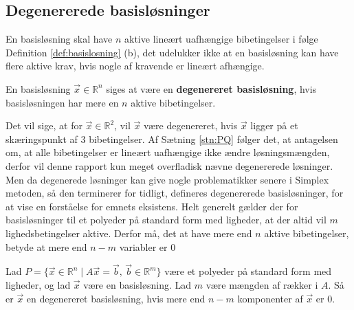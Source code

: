 \subsection{Degenererede basisløsninger}
En basisløsning skal have $n$ aktive lineært uafhængige bibetingelser i følge Definition \ref{def:basislosning} (b), det udelukker ikke at en basisløsning kan have flere aktive krav, hvis nogle af kravende er lineært afhængige. 
\begin{defn}
En basisløsning $\vec{x}\in \mathds{R}^n$ siges at være en \textbf{degenereret basisløsning}, hvis basisløsningen har mere en $n$ aktive bibetingelser.
\end{defn}
Det vil sige, at for $\vec{x}\in \mathds{R}^2$, vil $\vec{x}$ være degenereret, hvis $\vec{x}$ ligger på et skæringspunkt af $3$ bibetingelser.
Af Sætning \ref{stn:PQ} følger det, at antagelsen om, at alle bibetingelser er lineært uafhængige ikke ændre løsningsmængden, derfor vil denne rapport kun meget overfladisk nævne degenererede løsninger. 
Men da degenerede løsninger kan give nogle problematikker senere i Simplex metoden, så den terminerer for tidligt, defineres degenererede basisløsninger, for at vise en forståelse for emnets eksistens.
Helt generelt gælder der for basisløsninger til et polyeder på standard form med ligheder, at der altid vil $m$ lighedsbetingelser  aktive. Derfor må, det at have mere end $n$ aktive bibetingelser, betyde at mere end $n-m$ variabler er $0$
\begin{defn}
Lad $P =\{ \vec{x} \in \mathds{R}^n \mid A \vec{x} = \vec{b}, \, \vec{b}\in \mathds{R}^m\}$ være et polyeder på standard form med ligheder, og lad $\vec{x}$ være en basisløsning. Lad $m$ være mængden af rækker i $A$. Så er $\vec{x}$ en degenereret basisløsning, hvis mere end $n-m$ komponenter af $\vec{x}$ er $0$.
\end{defn}



